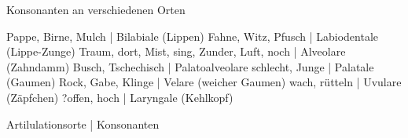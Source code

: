 \begin{frame}
  {Konsonanten an verschiedenen Orten}
  \onslide<+->
  \onslide<+->
  \begin{exe}
    \ex \alert{P}a\alert{pp}e, \alert{B}irne, \alert{M}ulch
    \onslide<+-> \alert{| Bilabiale (Lippen)}
    \onslide<+->
    \ex \alert{F}ahne, \alert{W}itz, \alert{Pf}usch
    \onslide<+-> \alert{| Labiodentale (Lippe-Zunge)}
    \onslide<+->
    \ex \alert{T}raum, \alert{d}ort, Mi\alert{s}t, \alert{s}ing, \alert{Z}under, \alert{L}uft, \alert{n}och
    \onslide<+-> \alert{| Alveolare (Zahndamm)}
    \onslide<+->
    \ex Bu\alert{sch}, \alert{Tsch}echisch
    \onslide<+-> \alert{| Palatoalveolare}
    \onslide<+->
    \ex schle\alert{ch}t, \alert{J}unge
    \onslide<+-> \alert{| Palatale (Gaumen)}
    \onslide<+->
    \ex Ro\alert{ck}, \alert{G}abe, Kli\alert{ng}e
    \onslide<+-> \alert{| Velare (weicher Gaumen)}
    \onslide<+->
    \ex wa\alert{ch}, \alert{r}ütteln
    \onslide<+-> \alert{| Uvulare (Zäpfchen)}
    \onslide<+->
    \ex \alert{?}offen, \alert{h}och
    \onslide<+-> \alert{| Laryngale (Kehlkopf)}
  \end{exe}
\end{frame}


\begin{frame}
  {Artilulationsorte | Konsonanten}
  \centering
\end{frame}


